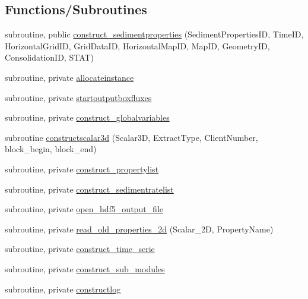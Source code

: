\subsection*{Functions/\+Subroutines}
\begin{DoxyCompactItemize}
\item 
subroutine, public \mbox{\hyperlink{namespacemodulesedimentproperties_a73be9d7faf93dc6b2994d535213bbd58}{construct\+\_\+sedimentproperties}} (Sediment\+Properties\+ID, Time\+ID, Horizontal\+Grid\+ID, Grid\+Data\+ID, Horizontal\+Map\+ID, Map\+ID, Geometry\+ID, Consolidation\+ID, S\+T\+AT)
\item 
subroutine, private \mbox{\hyperlink{namespacemodulesedimentproperties_a0e2131732a53a8682cb31baa3a65d6ae}{allocateinstance}}
\item 
subroutine, private \mbox{\hyperlink{namespacemodulesedimentproperties_a003fd1b9c4a46c432214de1d337ed97a}{startoutputboxfluxes}}
\item 
subroutine, private \mbox{\hyperlink{namespacemodulesedimentproperties_ac04693b92d1ed98577124026a0fb1d2e}{construct\+\_\+globalvariables}}
\item 
subroutine \mbox{\hyperlink{namespacemodulesedimentproperties_a8f2d8b343c149475187c15596c0bde5e}{constructscalar3d}} (Scalar3D, Extract\+Type, Client\+Number, block\+\_\+begin, block\+\_\+end)
\item 
subroutine, private \mbox{\hyperlink{namespacemodulesedimentproperties_abc91092616fbf4edf02daa5a7b1fcbb9}{construct\+\_\+propertylist}}
\item 
subroutine, private \mbox{\hyperlink{namespacemodulesedimentproperties_ac8e0d26b714ef94bff3a38a7730ee2a5}{construct\+\_\+sedimentratelist}}
\item 
subroutine, private \mbox{\hyperlink{namespacemodulesedimentproperties_a53b69fba92a04f1c26ee8ee39794357d}{open\+\_\+hdf5\+\_\+output\+\_\+file}}
\item 
subroutine, private \mbox{\hyperlink{namespacemodulesedimentproperties_a4e8f3da0b8583fb335570e3c3f8a4bb0}{read\+\_\+old\+\_\+properties\+\_\+2d}} (Scalar\+\_\+2D, Property\+Name)
\item 
subroutine, private \mbox{\hyperlink{namespacemodulesedimentproperties_a96254e985001cdec16870dc8c0188366}{construct\+\_\+time\+\_\+serie}}
\item 
subroutine, private \mbox{\hyperlink{namespacemodulesedimentproperties_a908a832201f28cb160dc5c859ab8af03}{construct\+\_\+sub\+\_\+modules}}
\item 
subroutine, private \mbox{\hyperlink{namespacemodulesedimentproperties_a8adc335e0f9814d9866b9c91620279fb}{constructlog}}

\end{DoxyCompactItemize}
